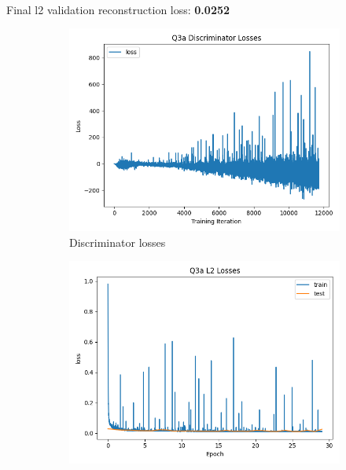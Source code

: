 \documentclass{article}
\begin{document}
\newpage
{}\\

Final l2 validation reconstruction loss: \textbf{0.0252} \\
\begin{figure}[H]
    \centering
    \begin{subfigure}{0.45\textwidth}
        \centering
        \includegraphics[width=\textwidth]{figures/q3a_gan_losses.png}
        \caption{Discriminator losses}
    \end{subfigure}
    \begin{subfigure}{0.45\textwidth}
        \centering
        \includegraphics[width=\textwidth]{figures/q3a_l2_losses.png}

\end{subfigure}
\end{figure}
\end{document}
